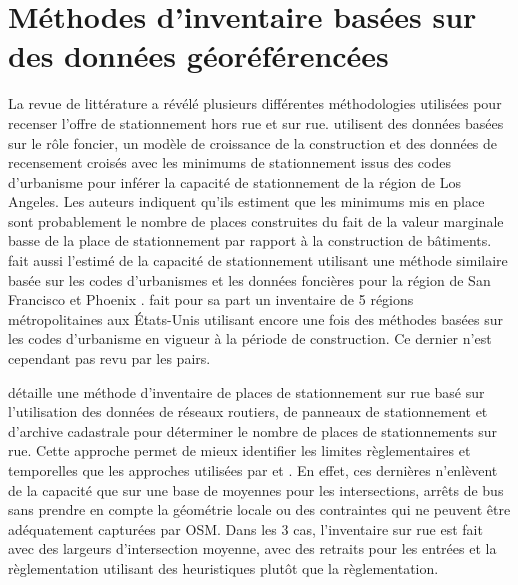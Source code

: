 \section{Méthodes d'inventaire basées sur des données géoréférencées}
La revue de littérature a révélé plusieurs différentes méthodologies utilisées pour recenser l'offre de stationnement hors rue et sur rue. \textcite{Chester:ParkingInfrastructure:2015} utilisent des données basées sur le rôle foncier, un modèle de croissance de la construction et des données de recensement croisés avec les minimums de stationnement issus des codes d'urbanisme pour inférer la capacité de stationnement de la région de Los Angeles. Les auteurs indiquent qu'ils estiment que les minimums mis en place sont probablement le nombre de places construites du fait de la valeur marginale basse de la place de stationnement par rapport à la construction de bâtiments. \citeauthor{Chester:InventoryingSan:2022} fait aussi l'estimé de la capacité de stationnement utilisant une méthode similaire basée sur les codes d'urbanismes et les données foncières pour la région de San Francisco \parencite{Chester:InventoryingSan:2022} et Phoenix \parencite{Hoehne:ValleySundrenched:2019}. \textcite{Scharnhorst:QuantifiedParking:2018} fait pour sa part un inventaire de 5 régions métropolitaines aux États-Unis utilisant encore une fois des méthodes basées sur les codes d'urbanisme en vigueur à la période de construction. Ce dernier n'est cependant pas revu par les pairs. \par 
\textcite{Bourdeau:MethodologieAnalyse:2014} détaille une méthode d'inventaire de places de stationnement sur rue basé sur l'utilisation des données de réseaux routiers, de panneaux de stationnement et d'archive cadastrale pour déterminer le nombre de places de stationnements sur rue. Cette approche permet de mieux identifier les limites règlementaires et temporelles que les approches utilisées par \textcite{Chester:InventoryingSan:2022} et \textcite{Scharnhorst:QuantifiedParking:2018}. En effet, ces dernières n'enlèvent de la capacité que sur une base de moyennes pour les intersections, arrêts de bus sans prendre en compte la géométrie locale ou des contraintes qui ne peuvent être adéquatement capturées par \ac{OSM}. Dans les 3 cas, l'inventaire sur rue est fait avec des largeurs d'intersection moyenne, avec des retraits pour les entrées et la règlementation utilisant des heuristiques plutôt que la règlementation. \par
